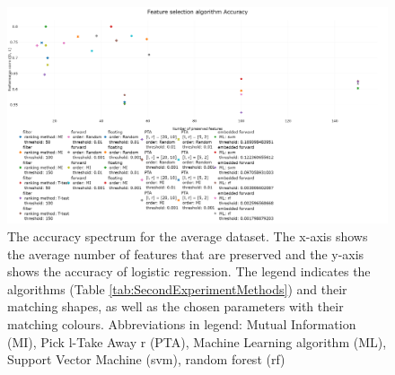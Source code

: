\documentclass[10pt,a4paper]{article}
\begin{document}
	\begin{figure}[H]
		\centering
		\includegraphics[angle=90,height=1.4\textwidth]{Accuracy_new.png}
		\caption{The accuracy spectrum for the average dataset. The x-axis shows the average number of features that are preserved and the y-axis shows the accuracy of logistic regression. The legend indicates the algorithms (Table \ref{tab:SecondExperimentMethods}) and their matching shapes, as well as the chosen parameters with their matching colours. Abbreviations in legend: Mutual Information (MI), Pick l-Take Away r (PTA), Machine Learning algorithm (ML), Support Vector Machine (svm), random forest (rf)}
		\label{fig:Avg_Accuracy_Spectrum}
	\end{figure}
\end{document}
